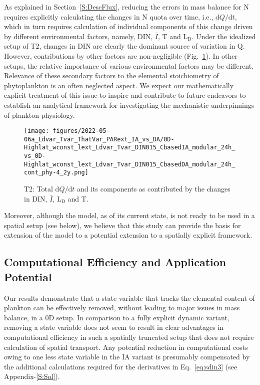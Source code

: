 \documentclass[gmd, manuscript]{copernicus}
\newcommand{\onur}[1]{\textcolor{blue}{\{Onur: #1\}}}
\begin{document}
As explained in Section~\ref{S:DescFlux}, reducing the errors in mass balance for N requires explicitly calculating the changes in N quota over time, i.e., $\textrm{d}Q/\textrm{d}t$, which in turn requires calculation of individual components of this change driven by different environmental factors, namely, DIN, $\bar{I}$, T and $\textrm{L}_{\textrm{D}}$.  Under the idealized setup of T2, changes in DIN are clearly the dominant source of variation in Q.  However, contributions by other factors are non-negligible (Fig.~\ref{f.T2dQdt}). In other setups, the relative importance of various environmental factors may be different. Relevance of these secondary factors to the elemental stoichiometry of phytoplankton is an often neglected aspect. We expect our mathematically explicit treatment of this issue to inspire and contribute to future endeavors to establish an analytical framework for investigating the mechanistic underpinnings of plankton physiology.

\begin{figure}[ht!]
\texttt{[image: figures/2022-05-06a\_Ldvar\_Tvar\_ThatVar\_PARext\_IA\_vs\_DA/0D-Highlat\_wconst\_lext\_Ldvar\_Tvar\_DIN015\_CbasedIA\_modular\_24h\_vs\_0D-Highlat\_wconst\_lext\_Ldvar\_Tvar\_DIN015\_CbasedDA\_modular\_24h\_cont\_phy-4\_2y.png]}
\caption{T2: Total $\textrm{d}Q/\textrm{d}t$ and its components as contributed by the changes in DIN, $\bar{I}$, $\textrm{L}_{\textrm{D}}$ and T.\label{f.T2dQdt}}
\end{figure}

 Moreover, although the model, as of its current state, is not ready to be used in a spatial setup (see below), we believe that this study can provide the basis for extension of the model to a potential extension to a spatially explicit framework.

\FloatBarrier
\subsection{Computational Efficiency and Application Potential}

Our results demonstrate that a state variable that tracks the elemental content of plankton can be effectively removed, without leading to major issues in mass balance, in a 0D setup. In comparison to a fully explicit dynamic variant, removing a state variable does not seem to result in clear advantages in computational efficiency in such a spatially truncated setup that does not require calculation of spatial transport.
Any potential reduction in computational costs owing to one less state variable in the IA variant is presumably compensated by the additional calculations required for the derivatives in Eq.~\eqref{eq:sdin3} (see Appendix-\ref{S:Sol}).
\end{document}
